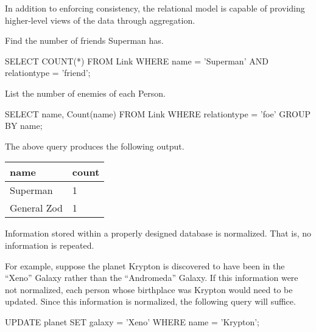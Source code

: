			In addition to enforcing consistency, the relational model is capable of providing higher-level views of the data through aggregation.
			
			\begin{ex}
				Find the number of friends Superman has.
				
				\begin{singlespaced}
					\begin{sqlcode}
SELECT COUNT(*)
FROM   Link
WHERE  name = 'Superman'
	   AND relationtype = 'friend'; 
					\end{sqlcode}
				\end{singlespaced}
			\end{ex}
			
			\begin{ex}
				List the number of enemies of each Person.
				
				\begin{singlespaced}
					\begin{sqlcode}
SELECT name,
	   Count(name)
FROM   Link
WHERE  relationtype = 'foe'
GROUP  BY name; 
					\end{sqlcode}
				\end{singlespaced}
				
				The above query produces the following output.
				
				\begin{table}[!ht]
					\centering
					
					\begin{tabular}{ll}
						\toprule
						name & count \\
						\midrule
						Superman & 1 \\
						General Zod & 1 \\
						\bottomrule
					\end{tabular}
				\end{table}
			\end{ex}
			
			Information stored within a properly designed database is normalized.  That is, no information is repeated.
			
			\begin{ex}[Normalization]
				For example, suppose the planet Krypton is discovered to have been in the ``Xeno'' Galaxy rather than the ``Andromeda'' Galaxy.	 If this information were not normalized, each person whose birthplace was Krypton would need to be updated.  Since this information is normalized, the following query will suffice.
				
				\begin{singlespaced}
					\begin{sqlcode}
UPDATE planet
SET	   galaxy = 'Xeno'
WHERE  name = 'Krypton';
					\end{sqlcode}
				\end{singlespaced}
			\end{ex}
			
